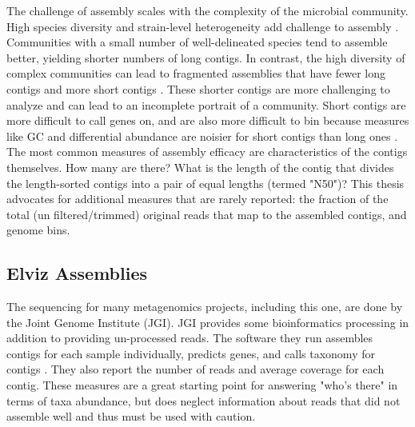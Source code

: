The challenge of assembly scales with the complexity of the microbial community.
High species diversity and strain-level heterogeneity add challenge to assembly \cite{kunin2008, thomas2012}.
Communities with a small number of well-delineated species tend to assemble better, yielding shorter numbers of long contigs.
In contrast, the high diversity of complex communities can lead to fragmented assemblies that have fewer long contigs and more short contigs \cite{kunin2008}.
These shorter contigs are more challenging to analyze and can lead to an incomplete portrait of a community.
Short contigs are more difficult to call genes on, and are also more difficult to bin because measures like GC and differential abundance are noisier for short contigs than long ones \cite{sangwan2016}.
The most common measures of assembly efficacy are characteristics of the contigs themselves.  How many are there?  What is the length of the contig that divides the length-sorted contigs into a pair of equal lengths (termed "N50")?
This thesis advocates for additional measures that are rarely reported: the fraction of the total (un filtered/trimmed) original reads that map to the assembled contigs, and genome bins.   %

\subsection{Elviz Assemblies}
The sequencing for many metagenomics projects, including this one, are done by the Joint Genome Institute (JGI).
JGI provides some bioinformatics processing in addition to providing un-processed reads.
The software they run assembles contigs for each sample individually, predicts genes, and calls taxonomy for contigs \cite{cantor2015}.
They also report the number of reads and average coverage for each contig.
These measures are a great starting point for answering "who's there" in terms of taxa abundance, but does neglect information about reads that did not assemble well and thus must be used with caution.

